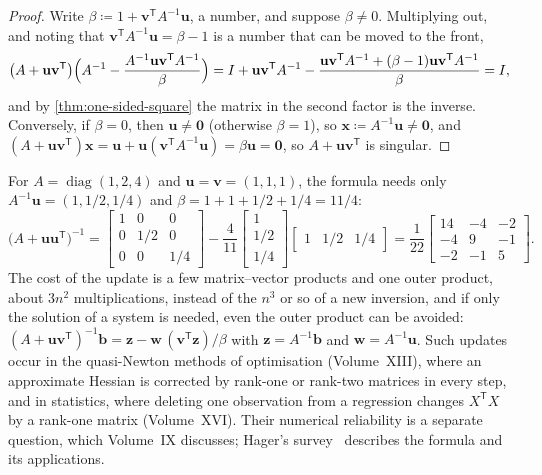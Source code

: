 \begin{proof}
Write $\beta\coloneqq1+\mathbf v^{\mathsf T}A^{-1}\mathbf u$, a number, and suppose $\beta\ne0$. Multiplying out, and noting that $\mathbf v^{\mathsf T}A^{-1}\mathbf u=\beta-1$ is a number that can be moved to the front,
\[
\bigl(A+\mathbf u\mathbf v^{\mathsf T}\bigr)\Bigl(A^{-1}-\frac{A^{-1}\mathbf u\mathbf v^{\mathsf T}A^{-1}}\beta\Bigr)=I+\mathbf u\mathbf v^{\mathsf T}A^{-1}-\frac{\mathbf u\mathbf v^{\mathsf T}A^{-1}+(\beta-1)\mathbf u\mathbf v^{\mathsf T}A^{-1}}\beta=I,
\]
and by \cref{thm:one-sided-square} the matrix in the second factor is the inverse. Conversely, if $\beta=0$, then $\mathbf u\ne\mathbf 0$ (otherwise $\beta=1$), so $\mathbf x\coloneqq A^{-1}\mathbf u\ne\mathbf 0$, and $(A+\mathbf u\mathbf v^{\mathsf T})\mathbf x=\mathbf u+\mathbf u(\mathbf v^{\mathsf T}A^{-1}\mathbf u)=\beta\mathbf u=\mathbf 0$, so $A+\mathbf u\mathbf v^{\mathsf T}$ is singular.
\end{proof}

For $A=\operatorname{diag}(1,2,4)$ and $\mathbf u=\mathbf v=(1,1,1)$, the formula needs only $A^{-1}\mathbf u=(1,1/2,1/4)$ and $\beta=1+1+1/2+1/4=11/4$:
\[
\bigl(A+\mathbf u\mathbf u^{\mathsf T}\bigr)^{-1}=\begin{bmatrix}1&0&0\\0&1/2&0\\0&0&1/4\end{bmatrix}-\frac4{11}\begin{bmatrix}1\\1/2\\1/4\end{bmatrix}\begin{bmatrix}1&1/2&1/4\end{bmatrix}=\frac1{22}\begin{bmatrix}14&-4&-2\\-4&9&-1\\-2&-1&5\end{bmatrix}.
\]
The cost of the update is a few matrix--vector products and one outer product, about $3n^2$ multiplications, instead of the $n^3$ or so of a new inversion, and if only the solution of a system is needed, even the outer product can be avoided: $(A+\mathbf u\mathbf v^{\mathsf T})^{-1}\mathbf b=\mathbf z-\mathbf w\,(\mathbf v^{\mathsf T}\mathbf z)/\beta$ with $\mathbf z=A^{-1}\mathbf b$ and $\mathbf w=A^{-1}\mathbf u$. Such updates occur in the quasi-Newton methods of optimisation (Volume~XIII), where an approximate Hessian is corrected by rank-one or rank-two matrices in every step, and in statistics, where deleting one observation from a regression changes $X^{\mathsf T}X$ by a rank-one matrix (Volume~XVI). Their numerical reliability is a separate question, which Volume~IX discusses; Hager's survey~\cite{hager1989} describes the formula and its applications.

